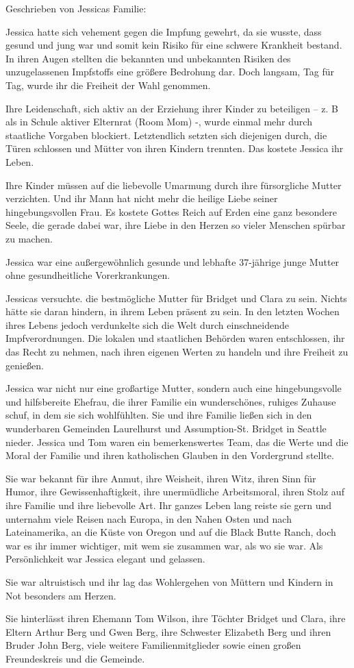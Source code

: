 Geschrieben von Jessicas Familie:

Jessica hatte sich vehement gegen die Impfung gewehrt, da sie wusste, dass
gesund und jung war und somit kein Risiko für eine schwere Krankheit bestand. In
ihren Augen stellten die bekannten und unbekannten Risiken des unzugelassenen
Impfstoffs eine größere Bedrohung dar. Doch langsam, Tag für Tag, wurde ihr die
Freiheit der Wahl genommen.

Ihre Leidenschaft, sich aktiv an der Erziehung ihrer Kinder zu beteiligen – z. B
als in Schule aktiver Elternrat (Room Mom) -, wurde einmal mehr durch staatliche
Vorgaben blockiert. Letztendlich setzten sich diejenigen durch, die Türen
schlossen und Mütter von ihren Kindern trennten. Das kostete Jessica ihr Leben.

Ihre Kinder müssen auf die liebevolle Umarmung durch ihre fürsorgliche Mutter
verzichten. Und ihr Mann hat nicht mehr die heilige Liebe seiner
hingebungsvollen Frau. Es kostete Gottes Reich auf Erden eine ganz besondere
Seele, die gerade dabei war, ihre Liebe in den Herzen so vieler Menschen spürbar
zu machen.

Jessica war eine außergewöhnlich gesunde und lebhafte 37-jährige junge Mutter
ohne gesundheitliche Vorerkrankungen.

Jessicas versuchte. die bestmögliche Mutter für Bridget und Clara zu
sein. Nichts hätte sie daran hindern, in ihrem Leben präsent zu sein. In den
letzten Wochen ihres Lebens jedoch verdunkelte sich die Welt durch
einschneidende Impfverordnungen. Die lokalen und staatlichen Behörden waren
entschlossen, ihr das Recht zu nehmen, nach ihren eigenen Werten zu handeln und
ihre Freiheit zu genießen.

Jessica war nicht nur eine großartige Mutter, sondern auch eine hingebungsvolle
und hilfsbereite Ehefrau, die ihrer Familie ein wunderschönes, ruhiges Zuhause
schuf, in dem sie sich wohlfühlten. Sie und ihre Familie ließen sich in den
wunderbaren Gemeinden Laurelhurst und Assumption-St. Bridget in Seattle
nieder. Jessica und Tom waren ein bemerkenswertes Team, das die Werte und die
Moral der Familie und ihren katholischen Glauben in den Vordergrund stellte.

Sie war bekannt für ihre Anmut, ihre Weisheit, ihren Witz, ihren Sinn für Humor,
ihre Gewissenhaftigkeit, ihre unermüdliche Arbeitsmoral, ihren Stolz auf ihre
Familie und ihre liebevolle Art. Ihr ganzes Leben lang reiste sie gern und
unternahm viele Reisen nach Europa, in den Nahen Osten und nach Lateinamerika,
an die Küste von Oregon und auf die Black Butte Ranch, doch war es ihr immer
wichtiger, mit wem sie zusammen war, als wo sie war. Als Persönlichkeit war
Jessica elegant und gelassen.

Sie war altruistisch und ihr lag das Wohlergehen von Müttern und Kindern in Not
besonders am Herzen.

Sie hinterlässt ihren Ehemann Tom Wilson, ihre Töchter Bridget und Clara, ihre
Eltern Arthur Berg und Gwen Berg, ihre Schwester Elizabeth Berg und ihren Bruder
John Berg, viele weitere Familienmitglieder sowie einen großen Freundeskreis und
die Gemeinde.
